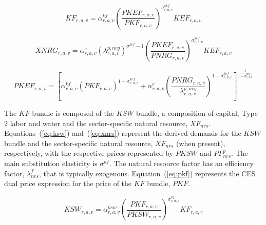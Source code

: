 \documentclass[11pt,letterpaper]{report}
\begin{document}
\begin{equation}
\label{eq:kf}
\mathit{KF}_{r,a,v} =
   \alpha^{\mathit{kf}}_{\mathit{r,a,v}}
   \left( \frac {\mathit{PKEF}_{r,a,v}} {\mathit{PKF}_{r,a,v}}
   \right)^{\sigma^{\mathit{kef}}_{\mathit{r,a,v}}}
   \mathit{KEF}_{r,a,v}
\end{equation}

\begin{equation}
\label{eq:xnrg}
\mathit{XNRG}_{r,a,v} =
   \alpha^{\mathit{e}}_{\mathit{r,a,v}}
   \left({\lambda^{p,\mathit{nrg}}_{r,a,v}}\right)^{\sigma^{\mathit{kef}} - 1}
   \left( \frac {\mathit{PKEF}_{r,a,v}} {\mathit{PNRG}_{r,a,v}}
   \right)^{\sigma^{\mathit{kef}}_{\mathit{r,a,v}}}
   \mathit{KEF}_{r,a,v}
\end{equation}

\begin{equation}
\label{eq:pkef}
\mathit{PKEF}_{r,a,v} =
   \left[
      \alpha^{\mathit{kf}}_{\mathit{r,a,v}}
      \left( \mathit{PKF}_{r,a,v}
      \right)^{1 - \sigma^{\mathit{kef}}_{\mathit{r,a,v}}}
   +  \alpha^{\mathit{e}}_{\mathit{r,a,v}}
      \left( \frac{\mathit{PNRG}_{r,a,v}}{\lambda^{p,\mathit{nrg}}_{r,a,v}}
      \right)^{1 - \sigma^{\mathit{kef}}_{\mathit{r,a,v}}}
   \right]^{\frac{1} {1 - \sigma^{\mathit{kef}}_{\mathit{r,a,v}}}}
\end{equation}

The $\mathit{KF}$ bundle is composed of the $\mathit{KSW}$ bundle, a composition
of capital, Type 2 labor and water and the sector-specific natural resource,
$\mathit{XF}_{\mathit{nrs}}$. Equations~(\ref{eq:ksw}) and~(\ref{eq:xnrs})
represent the derived demands for the $\mathit{KSW}$ bundle and the
sector-specific natural resource, $\mathit{XF}_{\mathit{nrs}}$ (when present),
respectively, with the respective prices represented by $\mathit{PKSW}$ and
$\mathit{PF}^p_{\mathit{nrs}}$. The main substitution elasticity is
$\sigma^{\mathit{kf}}$. The natural resource factor has an efficiency factor,
$\lambda^f_{\mathit{nrs}}$, that is typically exogenous. Equation~(\ref{eq:pkf})
represents the CES dual price expression for the price of the $\mathit{KF}$
bundle, $\mathit{PKF}$.

\begin{equation}
\label{eq:ksw}
\mathit{KSW}_{r,a,v} =
   \alpha^{\mathit{ksw}}_{\mathit{r,a,v}}
   \left( \frac {\mathit{PKF}_{r,a,v}} {\mathit{PKSW}_{r,a,v}}
   \right)^{\sigma^{\mathit{kf}}_{\mathit{r,a,v}}}
   \mathit{KF}_{r,a,v}
\end{equation}
\end{document}
